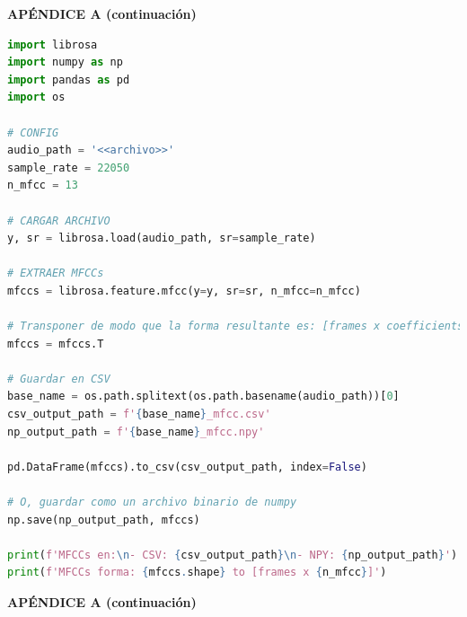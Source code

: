 \documentclass[12pt]{report}
\begin{document}
\pagebreak
\begin{center}
\large\textbf{APÉNDICE A (continuación)}
\end{center}

\begin{lstlisting}[language=Python, caption={Prueba para extracción de características.}, label={lst:test_mfcc}]
import librosa
import numpy as np
import pandas as pd
import os

# CONFIG
audio_path = '<<archivo>>'
sample_rate = 22050
n_mfcc = 13

# CARGAR ARCHIVO
y, sr = librosa.load(audio_path, sr=sample_rate)

# EXTRAER MFCCs
mfccs = librosa.feature.mfcc(y=y, sr=sr, n_mfcc=n_mfcc)

# Transponer de modo que la forma resultante es: [frames x coefficients]
mfccs = mfccs.T

# Guardar en CSV
base_name = os.path.splitext(os.path.basename(audio_path))[0]
csv_output_path = f'{base_name}_mfcc.csv'
np_output_path = f'{base_name}_mfcc.npy'

pd.DataFrame(mfccs).to_csv(csv_output_path, index=False)

# O, guardar como un archivo binario de numpy
np.save(np_output_path, mfccs)

print(f'MFCCs en:\n- CSV: {csv_output_path}\n- NPY: {np_output_path}')
print(f'MFCCs forma: {mfccs.shape} to [frames x {n_mfcc}]')
\end{lstlisting}

\pagebreak
\begin{center}
\large\textbf{APÉNDICE A (continuación)}
\end{center}
\end{document}
